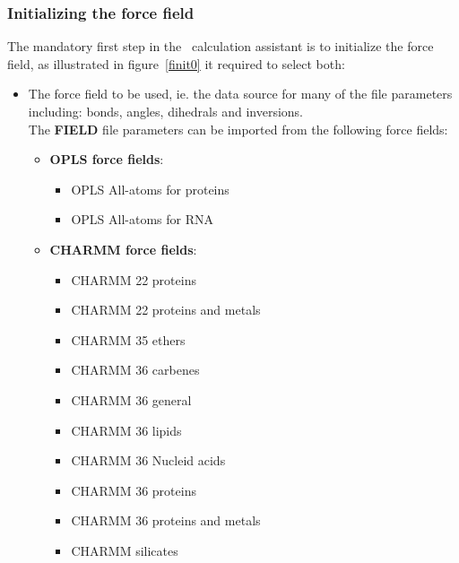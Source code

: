 \subsubsection{Initializing the force field}

The mandatory first step in the \dlpoly\ calculation assistant is to initialize the force field, as illustrated in figure~\ref{finit0} it required to select both: 
\begin{itemize}
\item The force field to be used, ie. the data source for many of the  file parameters including: bonds, angles, dihedrals and inversions. \\
The {\bf{FIELD}} file parameters can be imported from the following force fields: \\[0.35cm]
{\footnotesize{
\begin{minipage}{8cm}
\begin{itemize}
\item {\bf{OPLS force fields}}:
\begin{itemize}
\item OPLS All-atoms for proteins
\item OPLS All-atoms for RNA \\
\end{itemize}
\item {\bf{CHARMM force fields}}:
\begin{itemize}
\item CHARMM 22 proteins
\item CHARMM 22 proteins and metals
\item CHARMM 35 ethers
\item CHARMM 36 carbenes
\item CHARMM 36 general
\item CHARMM 36 lipids
\item CHARMM 36 Nucleid acids
\item CHARMM 36 proteins
\item CHARMM 36 proteins and metals
\item CHARMM silicates
\end{itemize}
\end{itemize}
\end{minipage}
\hspace{0.5cm}
\begin{minipage}{7cm}

\end{minipage}}}
\end{itemize}
